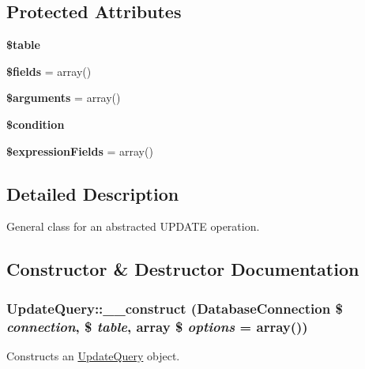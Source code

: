 \subsection*{Protected Attributes}
\begin{DoxyCompactItemize}
\item 
\hypertarget{classUpdateQuery_ae5bf8255e204fb23d89b19a95b016351}{
{\bfseries \$table}}
\label{classUpdateQuery_ae5bf8255e204fb23d89b19a95b016351}

\item 
\hypertarget{classUpdateQuery_ae3451ca3244bafac9956982e263a5105}{
{\bfseries \$fields} = array()}
\label{classUpdateQuery_ae3451ca3244bafac9956982e263a5105}

\item 
\hypertarget{classUpdateQuery_a083ad60a980eb8b4bada7a63eff93bf1}{
{\bfseries \$arguments} = array()}
\label{classUpdateQuery_a083ad60a980eb8b4bada7a63eff93bf1}

\item 
\hypertarget{classUpdateQuery_a146b6ccfe8250eccd6158fecd3253a20}{
{\bfseries \$condition}}
\label{classUpdateQuery_a146b6ccfe8250eccd6158fecd3253a20}

\item 
\hypertarget{classUpdateQuery_a7edafa4a4a01a3818a96b6521ef878db}{
{\bfseries \$expressionFields} = array()}
\label{classUpdateQuery_a7edafa4a4a01a3818a96b6521ef878db}

\end{DoxyCompactItemize}


\subsection{Detailed Description}
General class for an abstracted UPDATE operation. 

\subsection{Constructor \& Destructor Documentation}
\hypertarget{classUpdateQuery_a55a718df235cde8e96776d9c96d4574e}{
\subsubsection[{\_\-\_\-construct}]{\setlength{\rightskip}{0pt plus 5cm}UpdateQuery::\_\-\_\-construct ({\bf DatabaseConnection} \$ {\em connection}, \/  \$ {\em table}, \/  array \$ {\em options} = {\ttfamily array()})}}
\label{classUpdateQuery_a55a718df235cde8e96776d9c96d4574e}
Constructs an \hyperlink{classUpdateQuery}{UpdateQuery} object.


